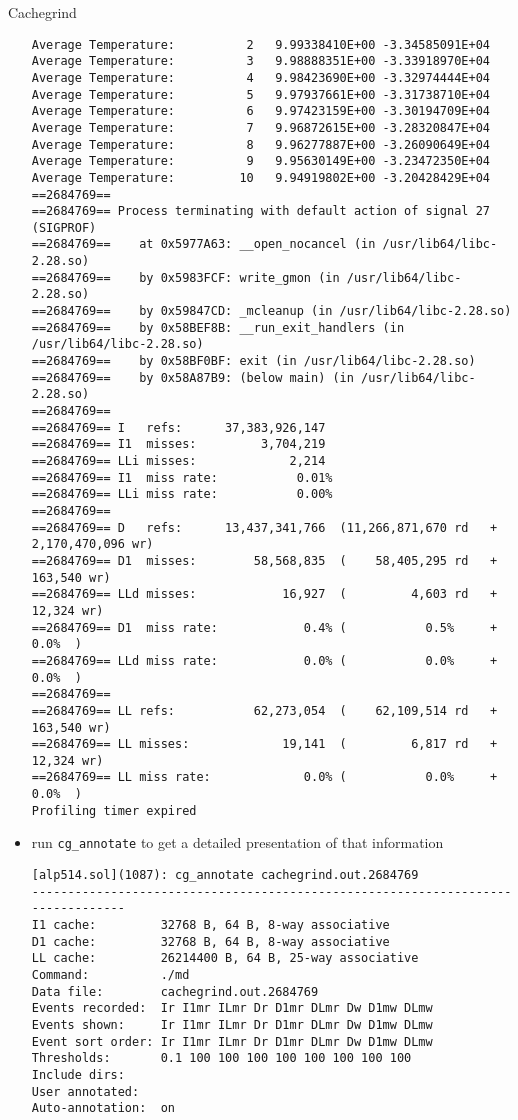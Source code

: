 \documentclass[10pt,t]{beamer}
\begin{document}
\begin{frame}{Cachegrind}
\begin{itemize}
\begin{lstlisting}[basicstyle=\fontsize{4.5}{5.5}\selectfont\ttfamily]
Average Temperature:          2   9.99338410E+00 -3.34585091E+04
Average Temperature:          3   9.98888351E+00 -3.33918970E+04
Average Temperature:          4   9.98423690E+00 -3.32974444E+04
Average Temperature:          5   9.97937661E+00 -3.31738710E+04
Average Temperature:          6   9.97423159E+00 -3.30194709E+04
Average Temperature:          7   9.96872615E+00 -3.28320847E+04
Average Temperature:          8   9.96277887E+00 -3.26090649E+04
Average Temperature:          9   9.95630149E+00 -3.23472350E+04
Average Temperature:         10   9.94919802E+00 -3.20428429E+04
==2684769==
==2684769== Process terminating with default action of signal 27 (SIGPROF)
==2684769==    at 0x5977A63: __open_nocancel (in /usr/lib64/libc-2.28.so)
==2684769==    by 0x5983FCF: write_gmon (in /usr/lib64/libc-2.28.so)
==2684769==    by 0x59847CD: _mcleanup (in /usr/lib64/libc-2.28.so)
==2684769==    by 0x58BEF8B: __run_exit_handlers (in /usr/lib64/libc-2.28.so)
==2684769==    by 0x58BF0BF: exit (in /usr/lib64/libc-2.28.so)
==2684769==    by 0x58A87B9: (below main) (in /usr/lib64/libc-2.28.so)
==2684769==
==2684769== I   refs:      37,383,926,147
==2684769== I1  misses:         3,704,219
==2684769== LLi misses:             2,214
==2684769== I1  miss rate:           0.01%
==2684769== LLi miss rate:           0.00%
==2684769==
==2684769== D   refs:      13,437,341,766  (11,266,871,670 rd   + 2,170,470,096 wr)
==2684769== D1  misses:        58,568,835  (    58,405,295 rd   +       163,540 wr)
==2684769== LLd misses:            16,927  (         4,603 rd   +        12,324 wr)
==2684769== D1  miss rate:            0.4% (           0.5%     +           0.0%  )
==2684769== LLd miss rate:            0.0% (           0.0%     +           0.0%  )
==2684769==
==2684769== LL refs:           62,273,054  (    62,109,514 rd   +       163,540 wr)
==2684769== LL misses:             19,141  (         6,817 rd   +        12,324 wr)
==2684769== LL miss rate:             0.0% (           0.0%     +           0.0%  )
Profiling timer expired
      \end{lstlisting}
    \item run \lstinline|cg_annotate| to get a detailed presentation of that information
      \begin{lstlisting}[basicstyle=\fontsize{4.5}{5.5}\selectfont\ttfamily]
[alp514.sol](1087): cg_annotate cachegrind.out.2684769
--------------------------------------------------------------------------------
I1 cache:         32768 B, 64 B, 8-way associative
D1 cache:         32768 B, 64 B, 8-way associative
LL cache:         26214400 B, 64 B, 25-way associative
Command:          ./md
Data file:        cachegrind.out.2684769
Events recorded:  Ir I1mr ILmr Dr D1mr DLmr Dw D1mw DLmw
Events shown:     Ir I1mr ILmr Dr D1mr DLmr Dw D1mw DLmw
Event sort order: Ir I1mr ILmr Dr D1mr DLmr Dw D1mw DLmw
Thresholds:       0.1 100 100 100 100 100 100 100 100
Include dirs:
User annotated:
Auto-annotation:  on


\end{lstlisting}
\end{itemize}
\end{frame}
\end{document}
